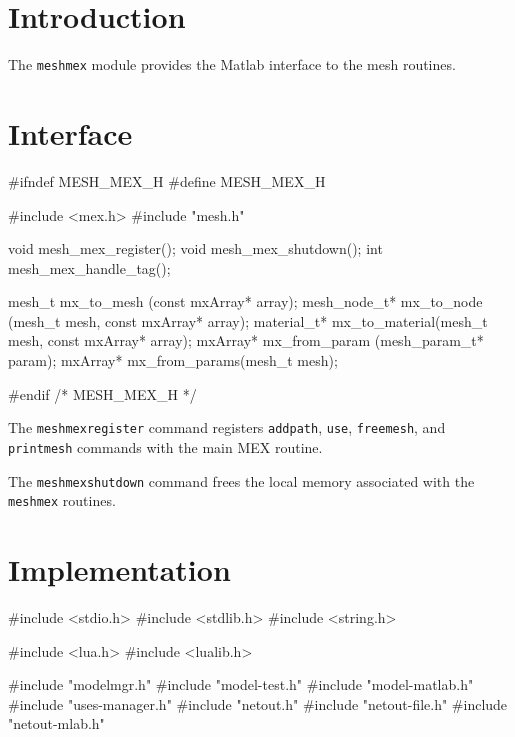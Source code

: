 
\section{Introduction}

The {\tt{}mesh{}mex} module provides the Matlab interface to the 
mesh routines.


\section{Interface}

\endmoddef
#ifndef MESH_MEX_H
#define MESH_MEX_H

#include <mex.h>
#include "mesh.h"

void mesh_mex_register();
void mesh_mex_shutdown();
int  mesh_mex_handle_tag();

mesh_t       mx_to_mesh    (const mxArray* array);
mesh_node_t* mx_to_node    (mesh_t mesh, const mxArray* array);
material_t*  mx_to_material(mesh_t mesh, const mxArray* array);
mxArray*     mx_from_param (mesh_param_t* param);
mxArray*     mx_from_params(mesh_t mesh);

#endif /* MESH_MEX_H */
\nwendcode{}\nwdocspar

The {\tt{}mesh{}mex{}register} command registers {\tt{}addpath},
{\tt{}use}, {\tt{}freemesh}, and {\tt{}printmesh} commands with
the main MEX routine.

The {\tt{}mesh{}mex{}shutdown} command frees the local memory
associated with the {\tt{}mesh{}mex} routines.


\section{Implementation}

\nwenddocs{}\endmoddef
#include <stdio.h>
#include <stdlib.h>
#include <string.h>

#include <lua.h>
#include <lualib.h>

#include "modelmgr.h"
#include "model-test.h"
#include "model-matlab.h"
#include "uses-manager.h"
#include "netout.h"
#include "netout-file.h"
#include "netout-mlab.h"

